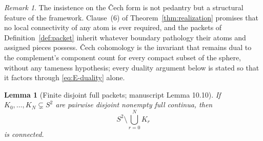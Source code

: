 \documentclass[11pt,reqno]{amsart}
\newtheorem{lemma}[theorem]{Lemma}
\theoremstyle{definition}
\theoremstyle{remark}
\newtheorem{remark}[theorem]{Remark}
\begin{document}
\begin{remark}\label{rem:E-cech}
The insistence on the \v{C}ech form is not pedantry but a structural feature of the
framework. Clause~(6) of Theorem~\ref{thm:realization} promises that no local
connectivity of any atom is ever required, and the packets of
Definition~\ref{def:packet} inherit whatever boundary pathology their atoms and
assigned pieces possess. \v{C}ech cohomology is the invariant that remains dual to
the complement's component count for every compact subset of the sphere, without any
tameness hypothesis; every duality argument below is stated so that it factors
through \eqref{eq:E-duality} alone.
\end{remark}

\begin{lemma}[Finite disjoint full packets; manuscript Lemma 10.10]\label{lem:packets}
If $K_0,\dots,K_N\subsetneq S^2$ are pairwise disjoint nonempty full
continua, then
\[
S^2\setminus\bigcup_{r=0}^{N}K_r
\]
is connected.
\end{lemma}
\end{document}
